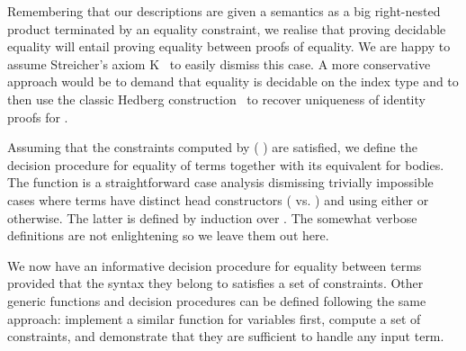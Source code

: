 Remembering that our descriptions are given a semantics as a big right-nested
product terminated by an equality constraint, we realise that proving decidable
equality will entail proving equality between proofs of equality. We are happy
to assume Streicher's axiom K~\cite{DBLP:conf/lics/HofmannS94} to easily
dismiss this case. A more conservative approach would be to demand that equality
is decidable on the index type  and to then use the classic Hedberg
construction~\cite{DBLP:journals/jfp/Hedberg98} to recover uniqueness of
identity proofs for .

Assuming that the constraints computed by {( )} are
satisfied, we define the decision procedure for equality of terms together
with its equivalent for bodies. The function 
is a straightforward case analysis dismissing trivially impossible cases
where terms have distinct head constructors ( vs. )
and using either  or 
otherwise. The latter is defined by induction over . The somewhat
verbose definitions are not enlightening so we leave them out here.

\begin{agdasnippet}
\end{agdasnippet}

We now have an informative decision procedure for equality between terms
provided that the syntax they belong to satisfies a set of constraints.
Other generic functions and decision procedures can be defined
following the same approach: implement a similar function for variables
first, compute a set of constraints, and demonstrate that they are
sufficient to handle any input term.
